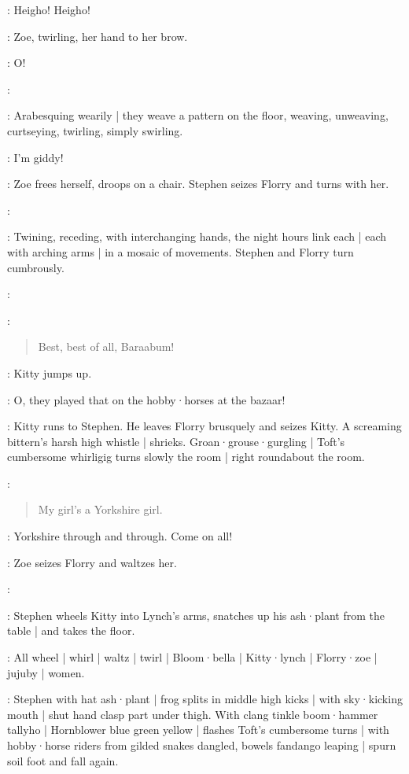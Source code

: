 \Bracelets:
Heigho!
Heigho!

:
Zoe,
twirling,
her hand to her brow.

\Zoe:
O!

\Maginni:

:
Arabesquing wearily |
they weave a pattern on the floor,
weaving,
unweaving,
curtseying,
twirling,
simply swirling.

\Zoe:
I'm giddy!

:
Zoe frees herself,
droops on a chair.
Stephen seizes Florry and turns with her.

\Maginni:

:
Twining,
receding,
with interchanging hands,
the night hours link each |
each with arching arms |
in a mosaic of movements.
%
Stephen and Florry turn cumbrously.

\Maginni:

\Pianola[2]:
\begin{verse}
    Best, best of all,
    Baraabum!
\end{verse}

:
Kitty jumps up.

\Kitty:
O,
they played that on the hobby·horses at the  bazaar!

:
Kitty runs to Stephen.
%
He leaves Florry brusquely and seizes Kitty.
A screaming bittern's harsh high whistle |
shrieks.
Groan·grouse·gurgling |
Toft's cumbersome whirligig turns slowly the room |
right roundabout the room.

\Pianola:
\begin{verse}
    My girl's a Yorkshire girl.
\end{verse}

\Zoe:
Yorkshire through and through.
Come on all!

:
Zoe seizes Florry and waltzes her.

\Stephen:

:
Stephen wheels Kitty into Lynch's arms,
snatches up his ash·plant from the table |
and takes the floor.

:
All wheel |
whirl |
waltz |
twirl |
Bloom·bella |
Kitty·lynch |
Florry·zoe |
jujuby |
women.

:
Stephen with hat ash·plant |
frog splits in middle high kicks |
with sky·kicking mouth |
shut hand clasp part under thigh.
With clang tinkle boom·hammer tallyho |
Hornblower blue green yellow |
flashes Toft's cumbersome turns |
with hobby·horse riders from gilded snakes dangled,
bowels fandango leaping |
spurn soil foot and fall again.

